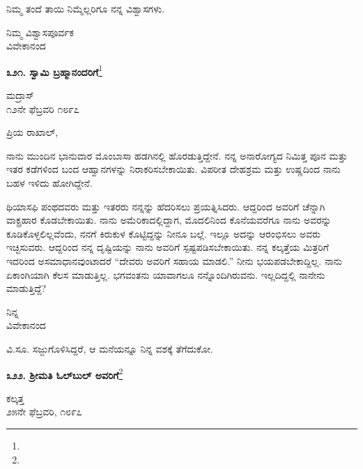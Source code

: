 ನಿಮ್ಮ ತಂದೆ ತಾಯಿ\enginline{-} ನಿಮ್ಮೆಲ್ಲರಿಗೂ ನನ್ನ ವಿಶ್ವಾಸಗಳು.

\vspace{-0.5cm}

{\flushright
ನಿಮ್ಮ ವಿಶ್ವಾಸಪೂರ್ವಕ\\ವಿವೇಕಾನಂದ\par}

\begin{center}
\textbf{೩೨೧. ಸ್ವಾಮಿ ಬ್ರಹ್ಮಾನಂದರಿಗೆ}\footnote{}
\end{center}

\vspace{-0.5cm}

\begin{flushright}
ಮದ್ರಾಸ್\\೧೨ನೇ ಫೆಬ್ರವರಿ ೧೮೯೭
\end{flushright}

\noindent
ಪ್ರಿಯ ರಾಖಾಲ್,

ನಾನು ಮುಂದಿನ ಭಾನುವಾರ  ಮೊಂಬಾಸಾ ಹಡಗಿನಲ್ಲಿ ಹೊರಡುತ್ತಿದ್ದೇನೆ. ನನ್ನ ಅನಾರೋಗ್ಯದ ನಿಮಿತ್ತ ಪೂನ ಮತ್ತು ಇತರ ಕಡೆಗಳಿಂದ ಬಂದ ಆಹ್ವಾನಗಳನ್ನು ನಿರಾಕರಿಸಬೇಕಾಯಿತು. ವಿಪರೀತ ದೇಹಶ್ರಮ ಮತ್ತು ಉಷ್ಣದಿಂದ ನಾನು ಬಹಳ ಇಳಿದು ಹೋಗಿದ್ದೇನೆ.

ಥಿಯಾಸಫಿ ಪಂಥದವರು ಮತ್ತು ಇತರರು ನನ್ನನ್ನು ಹೆದರಿಸಲು ಪ್ರಯತ್ನಿಸಿದರು. ಆದ್ದರಿಂದ ಅವರಿಗೆ ಚೆನ್ನಾಗಿ ವಾಕ್ಪ್ರಹಾರ ಕೊಡಬೇಕಾಯಿತು. ನಾನು ಅಮೆರಿಕಾದಲ್ಲಿದ್ದಾಗ, ಮೊದಲಿನಿಂದ ಕೊನೆಯವರೆಗೂ ನಾನು ಅವರನ್ನು ಕೂಡಿಕೊಳ್ಳಲಿಲ್ಲವೆಂದು, ನನಗೆ ಕಿರುಕುಳ ಕೊಟ್ಟಿದ್ದನ್ನು ನೀನೂ ಬಲ್ಲೆ. ಇಲ್ಲೂ ಅದನ್ನು ಆರಂಭಿಸಲು ಅವರು ಇಚ್ಛಿಸುವರು. ಆದ್ದರಿಂದ ನನ್ನ ದೃಷ್ಟಿಯನ್ನು ನಾನು ಅವರಿಗೆ ಸ್ಪಷ್ಟಪಡಿಸಬೇಕಾಯಿತು. ನನ್ನ ಕಲ್ಕತ್ತೆಯ ಮಿತ್ರರಿಗೆ ಇದರಿಂದ ಅಸಮಾಧಾನವುಂಟಾದರೆ “ದೇವರು ಅವರಿಗೆ ಸಹಾಯ ಮಾಡಲಿ.” ನೀನು ಭಯಪಡಬೇಕಾದ್ದಿಲ್ಲ. ನಾನು ಏಕಾಂಗಿಯಾಗಿ ಕೆಲಸ ಮಾಡುತ್ತಿಲ್ಲ. ಭಗವಂತನು ಯಾವಾಗಲೂ ನನ್ನೊಂದಿಗಿರುವನು. ಇಲ್ಲದಿದ್ದಲ್ಲಿ ನಾನೇನು ಮಾಡುತ್ತಿದ್ದೆ?

\vspace{-0.5cm}

{\flushright
ನಿನ್ನ\\ವಿವೇಕಾನಂದ\par}

ವಿ.ಸೂ.\enginline{-} ಸಜ್ಜುಗೊಳಿಸಿದ್ದರೆ, ಆ ಮನೆಯನ್ನೂ ನಿನ್ನ ವಶಕ್ಕೆ ತೆಗೆದುಕೋ.

\begin{center}
\textbf{೩೨೨. ಶ‍್ರೀಮತಿ ಓಲ್‌ಬುಲ್ ಅವರಿಗೆ}\footnote{}
\end{center}
\vspace{-0.7cm}

\begin{flushright}
ಕಲ್ಕತ್ತ\\೨೫ನೇ ಫೆಬ್ರವರಿ, ೧೮೯೭
\end{flushright}
\vspace{-0.3cm}


